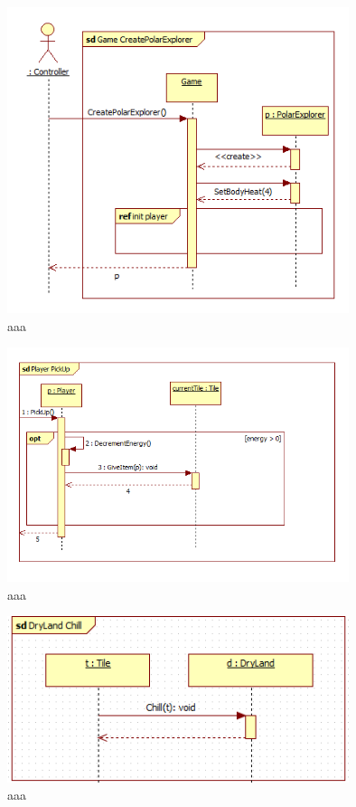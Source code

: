 \begin{figure}[H]
	\begin{center}
		\includegraphics[width=10cm]{chapters/chapter03/seqdiag/Game_CreatePolarExplorer.png}
		\caption{aaa}
		\label{bbb}
	\end{center}
\end{figure}
\begin{figure}[H]
	\begin{center}
		\includegraphics[width=10cm]{chapters/chapter03/seqdiag/Player_PickUp.png}
		\caption{aaa}
		\label{bbb}
	\end{center}
\end{figure}
\begin{figure}[H]
	\begin{center}
		\includegraphics[width=10cm]{chapters/chapter03/seqdiag/DryLand_Chill.png}
		\caption{aaa}
		\label{bbb}
	\end{center}
\end{figure}
